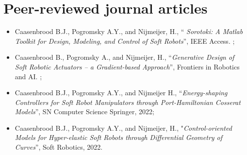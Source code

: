 \section*{Peer-reviewed journal articles}
\begin{itemize}[leftmargin=2mm]

\item Caasenbrood B.J., Pogromsky A.Y., and Nijmeijer, H., “\textit{ Sorotoki: A Matlab Toolkit for Design, Modeling, and Control of Soft Robots}”, IEEE Access. \ipj;

\item Caasenbrood B., Pogromsky A., and Nijmeijer, H., “\textit{Generative Design of Soft Robotic Actuators -- a Gradient-based Approach}”, Frontiers in Robotics and AI. \ipj;

\item  Caasenbrood B.J., Pogromsky A.Y., and Nijmeijer H., “\textit{Energy-shaping Controllers for Soft Robot Manipulators through Port-Hamiltonian Cosserat Models}”, SN Computer Science Springer, 2022;
\item Caasenbrood B.J., Pogromsky A.Y., and Nijmeijer, H., "\textit{Control-oriented Models for Hyper-elastic Soft Robots through Differential Geometry of Curves}”, Soft Robotics, 2022.
\end{itemize}

